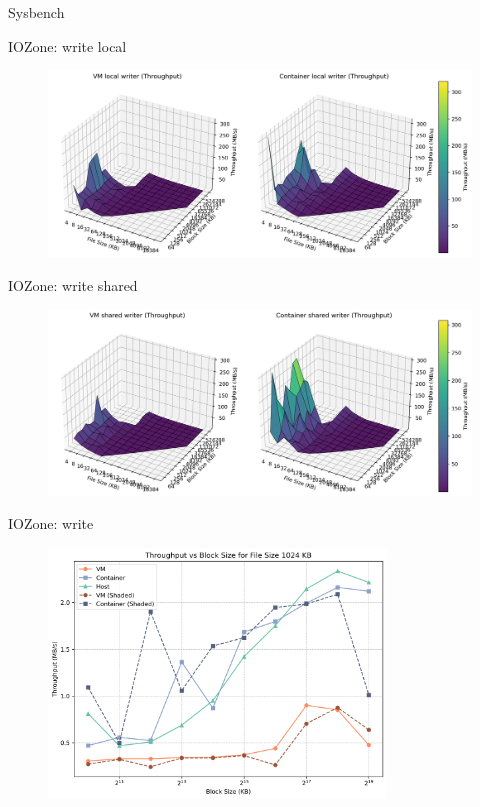 \documentclass[10pt]{beamer}
\begin{document}
\begin{frame}{Sysbench}
\end{frame}

\begin{frame}{IOZone: write local}
  \begin{figure}
    \centering
    \includegraphics[width=\textwidth]{VM local writer_Container local writer_log_surfaces.png}
  \end{figure}
\end{frame}

\begin{frame}{IOZone: write shared}
  \begin{figure}
    \centering
    \includegraphics[width=\textwidth]{VM shared writer_Container shared writer_log_surfaces.png}
  \end{figure}
\end{frame}

\begin{frame}{IOZone: write}
  \begin{figure}
    \centering
    \includegraphics[width=0.8\textwidth]{writer_filesize_1024.png}
  \end{figure}
\end{frame}
\end{document}
